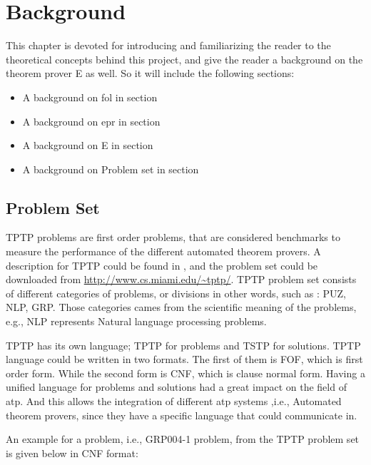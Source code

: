 \chapter{Background}\label{chap:background}


This chapter is devoted for introducing and familiarizing the reader to the theoretical concepts behind this project, and give the reader a background on the theorem prover E as well. So it will include the following sections:
	\begin{itemize}
		\item A background on \acf{fol} in section %
		\item A background on \acf{epr} in section %
		\item A background on E in section %
		\item A background on Problem set in section %
	\end{itemize}






\section{Problem Set}
TPTP problems are first order problems, that are considered benchmarks to measure the performance of the different automated theorem provers. A description for TPTP could be found in \cite{TPTP09}, and the problem set could be downloaded from \url{http://www.cs.miami.edu/~tptp/}. TPTP problem set consists of different categories of problems, or divisions in other words, such as : PUZ, NLP, GRP. Those categories cames from the scientific meaning of the problems, e.g., NLP represents Natural language processing problems.


TPTP has its own language; TPTP for problems and TSTP for solutions. TPTP language could be written in two formats. The first of them is FOF, which is first order form. While the second form is CNF, which is clause normal form. Having a unified language for problems and solutions had a great impact on the field of \ac{atp}. And this allows the integration of different \ac{atp} systems ,i.e., Automated theorem provers, since they have a specific language that could communicate in.  


An example for a problem, i.e., GRP004-1 problem, from the TPTP problem set is given below in CNF format:

